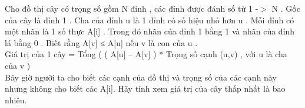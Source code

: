 Cho đồ thị cây có trọng số gồm N đỉnh , các đỉnh được đánh số từ 1 -$>$ N . Gốc của cây là đỉnh 1 . Cha của đỉnh u là 1 đỉnh có số hiệu nhỏ hơn u . Mỗi đỉnh có một nhãn là 1 số thực A[i] . Trong đó nhãn của đỉnh 1 bằng 1 và nhãn của đỉnh lá bằng 0 . Biết rằng A[v] ≤ A[u] nếu v là con của u .   
\\   Giá trị của 1 cây = Tổng (  ( A[u] – A[v] ) * Trọng số cạnh (u,v)  , với u là cha của v )   
\\   Bây giờ người ta cho biết các cạnh của đồ thị và trọng số của các cạnh này nhưng không cho biết các A[i]. Hãy tính xem giá trị của cây thấp nhất là bao nhiêu.  

\